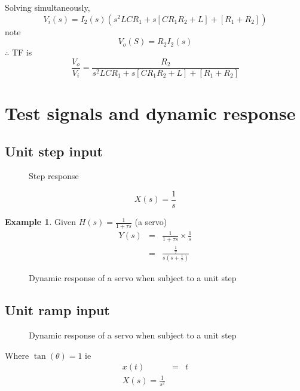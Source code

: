 \documentclass[11pt]{article} %
\theoremstyle{definition}
\newtheorem{example}{Example}
\begin{document}
Solving simultaneously,
\begin{equation}
V_i(s)=I_2(s)\left( s^2LCR_1+s\left[ CR_1R_2+L\right] + \left[R_1+R_2\right]\right)
\end{equation}
note
\begin{equation}
V_o(S)=R_2I_2(s)
\end{equation}
$\therefore$ TF is
\begin{equation}
\frac{V_o}{V_i} = \frac{R_2}{s^2LCR_1+s\left[ CR_1R_2+L\right] + \left[R_1+R_2\right]}
\end{equation}

\section{Test signals and dynamic response}
\subsection{Unit step input}
	\begin{figure}[h]
		\centering
		\caption{Step response}
	\end{figure}
\begin{equation}
X(s)=\frac{1}{s}
\end{equation}
\begin{example}
Given $H(s)=\frac{1}{1+\tau s}$ (a servo)
\begin{eqnarray}
Y(s) &=& \frac{1}{1+\tau s} \times \frac{1}{s} \nonumber \\
&=& \frac{\frac{1}{\tau}}{s\left( s+ \frac{1}{\tau}\right)}
\end{eqnarray}

\begin{figure}[h]
	\centering
	\caption{Dynamic response of a servo when subject to a unit step}
\end{figure}

\end{example}


\subsection{Unit ramp input}
\begin{figure}[h]
	\centering
	\caption{Dynamic response of a servo when subject to a unit step}
\end{figure}
Where $\tan (\theta) = 1$ ie
\begin{eqnarray}
x(t) &=& t \nonumber \\
X(s) = \frac{1}{s^2}
\end{eqnarray}
\end{document}

